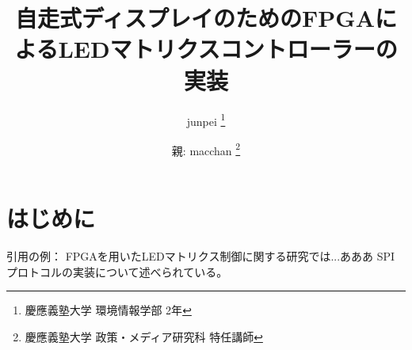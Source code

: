 \documentclass[a4paper,11pt, twocolumn]{ltjsarticle}
\title{ 自走式ディスプレイのためのFPGAによるLEDマトリクスコントローラーの実装 }
\author{ 
  junpei \thanks{慶應義塾大学 環境情報学部 2年}
  \and
  親: macchan \thanks{慶應義塾大学 政策・メディア研究科 特任講師}
}
\date{}
\begin{document}
\maketitle


\section*{はじめに}

引用の例：
FPGAを用いたLEDマトリクス制御に関する研究\cite{xilinx2023}では...あああ
SPIプロトコルの実装\cite{intel2023, altera2022}について述べられている。

\printbibliography[title=参考文献]
\end{document}
